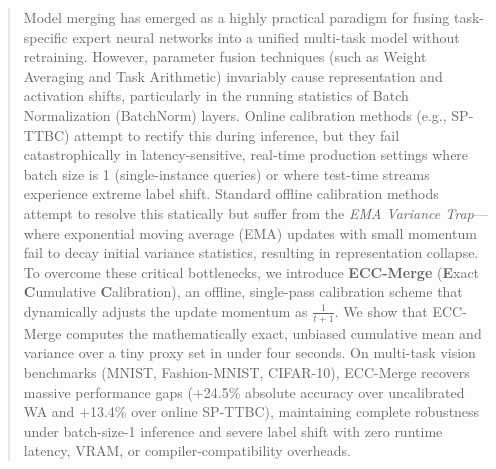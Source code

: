 \documentclass{article}
\theoremstyle{plain}
\theoremstyle{definition}
\theoremstyle{remark}
\begin{document}

\printAffiliationsAndNotice{}

\begin{abstract}
Model merging has emerged as a highly practical paradigm for fusing task-specific expert neural networks into a unified multi-task model without retraining. However, parameter fusion techniques (such as Weight Averaging and Task Arithmetic) invariably cause representation and activation shifts, particularly in the running statistics of Batch Normalization (BatchNorm) layers. Online calibration methods (e.g., SP-TTBC) attempt to rectify this during inference, but they fail catastrophically in latency-sensitive, real-time production settings where batch size is 1 (single-instance queries) or where test-time streams experience extreme label shift. Standard offline calibration methods attempt to resolve this statically but suffer from the \emph{EMA Variance Trap}—where exponential moving average (EMA) updates with small momentum fail to decay initial variance statistics, resulting in representation collapse. To overcome these critical bottlenecks, we introduce \textbf{ECC-Merge} (\textbf{E}xact \textbf{C}umulative \textbf{C}alibration), an offline, single-pass calibration scheme that dynamically adjusts the update momentum as $\frac{1}{t+1}$. We show that ECC-Merge computes the mathematically exact, unbiased cumulative mean and variance over a tiny proxy set in under four seconds. On multi-task vision benchmarks (MNIST, Fashion-MNIST, CIFAR-10), ECC-Merge recovers massive performance gaps (+24.5\% absolute accuracy over uncalibrated WA and +13.4\% over online SP-TTBC), maintaining complete robustness under batch-size-1 inference and severe label shift with zero runtime latency, VRAM, or compiler-compatibility overheads.
\end{abstract}
\end{document}
